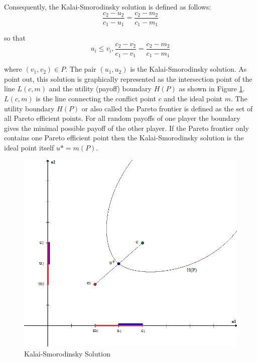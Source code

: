 Consequently, the Kalai-Smorodinsky solution is defined as follows:
\begin{equation}
\frac{c_2 - u_2}{c_1 - u_1} = \frac{c_2 - m_2}{c_1 - m_1}
\end{equation}

so that
\begin{equation}
u_i \leq v_i, \frac{c_2 - v_2}{c_1 - v_1} = \frac{c_2 - m_2}{c_1 - m_1} 
\end{equation}

where $(v_1,v_2) \in P$. The pair $(u_1,u_2)$ is the Kalai-Smorodinsky solution. As \citet{kalai1975other} point out, this solution is graphically represented as the intersection point of the line $L(c,m)$ and the utility (payoff) boundary $H(P)$ as shown in Figure \ref{fig:ksSol}. $L(c,m)$ is the line connecting the conflict point $c$ and the ideal point $m$. The utility boundary $H(P)$ or also called the Pareto frontier is defined as the set of all Pareto efficient points. For all random payoffs of one player the boundary gives the minimal possible payoff of the other player. If the Pareto frontier only contains one Pareto efficient point then the Kalai-Smorodinsky solution is the ideal point itself $u* = m(P)$.

\begin{figure}[h]
\centering
\includegraphics[scale=0.5]{figures/kalaiSmorodinskySolution}
\caption{Kalai-Smorodinsky Solution}
\label{fig:ksSol}
\end{figure}

